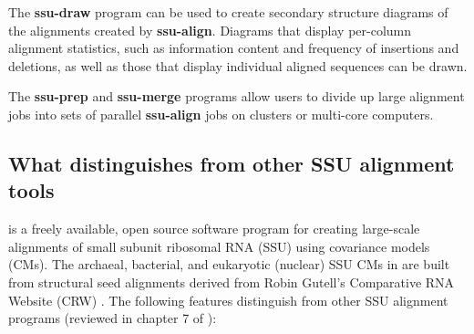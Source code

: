 The \textbf{ssu-draw} program can be used to create secondary
structure diagrams of the alignments created by 
\textbf{ssu-align}. Diagrams that display per-column alignment
statistics, such as information content and frequency of insertions
and deletions, as well as those that display individual aligned
sequences can be drawn.

The \textbf{ssu-prep} and \textbf{ssu-merge} programs allow users to
divide up large alignment jobs into sets of parallel
\textbf{ssu-align} jobs on clusters or multi-core computers.

\subsection{What distinguishes  from other SSU
  alignment tools}

 is a freely available, open source software program
for creating large-scale alignments of small subunit ribosomal RNA
(SSU) using covariance models (CMs). The archaeal, bacterial,
and eukaryotic (nuclear) 
SSU CMs in  are built from structural seed alignments derived from
Robin Gutell's Comparative RNA Website (CRW) \cite{CannoneGutell02}.
The following features distinguish  from other
SSU alignment programs (reviewed in chapter 7 of \cite{Nawrocki09b}):

